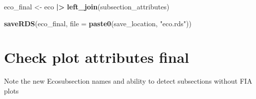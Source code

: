 \documentclass[
]{book}
\newenvironment{Shaded}{\begin{snugshade}}{\end{snugshade}}
\newcommand{\AttributeTok}[1]{\textcolor[rgb]{0.13,0.29,0.53}{#1}}
\newcommand{\FunctionTok}[1]{\textcolor[rgb]{0.13,0.29,0.53}{\textbf{#1}}}
\newcommand{\NormalTok}[1]{#1}
\newcommand{\OtherTok}[1]{\textcolor[rgb]{0.56,0.35,0.01}{#1}}
\newcommand{\SpecialCharTok}[1]{\textcolor[rgb]{0.81,0.36,0.00}{\textbf{#1}}}
\newcommand{\StringTok}[1]{\textcolor[rgb]{0.31,0.60,0.02}{#1}}
\begin{document}
\begin{Shaded}
\begin{Highlighting}[]
\NormalTok{eco\_final }\OtherTok{\textless{}{-}}\NormalTok{ eco }\SpecialCharTok{|\textgreater{}}
  \FunctionTok{left\_join}\NormalTok{(subsection\_attributes)}

\FunctionTok{saveRDS}\NormalTok{(eco\_final, }\AttributeTok{file =} \FunctionTok{paste0}\NormalTok{(save\_location, }\StringTok{"eco.rds"}\NormalTok{)) }
\end{Highlighting}
\end{Shaded}

\hypertarget{check-plot-attributes-final}{%
\section{Check plot attributes final}\label{check-plot-attributes-final}}

Note the new Ecosubsection names and ability to detect subsections without FIA plots
\end{document}
